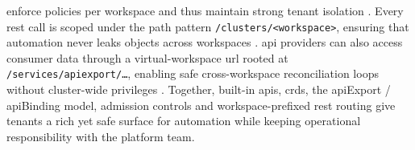 \documentclass[11pt, a4paper, oneside, listof=totoc]{scrartcl}
\begin{document}
                enforce policies per workspace and thus maintain strong tenant isolation
                \parencite{kcpAuthorization}.
                Every \gls{rest} call is scoped under the path pattern
                \texttt{/clusters/<workspace>}, ensuring that automation never leaks objects across
                workspaces \parencite{kcpAPIsREST}.
                \gls{api} providers can also access consumer data through a virtual-workspace
                \gls{url} rooted at \texttt{/services/apiexport/…}, enabling safe cross-workspace
                reconciliation loops without cluster-wide privileges \parencite{kcpAPIsREST}.
                Together, built-in \glspl{api}, \glspl{crd}, the \gls{api}Export / \gls{api}Binding
                model, admission controls and workspace-prefixed \gls{rest} routing give tenants a
                rich yet safe surface for automation while keeping operational responsibility with
                the platform team.
\end{document}
